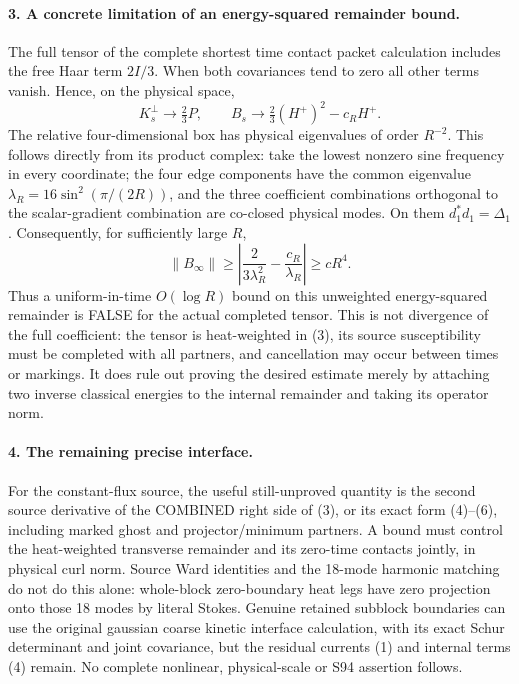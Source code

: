 \documentclass[11pt]{article}
\begin{document}
\paragraph{3. A concrete limitation of an energy-squared remainder bound.}
The full tensor of the complete shortest time contact packet calculation includes the free Haar term $2I/3$. When both
covariances tend to zero all other terms vanish. Hence, on the physical
space,
\[
 K_s^\perp\longrightarrow\tfrac23P,\qquad
 B_s\longrightarrow\tfrac23(H^+)^2-c_RH^+.                    \tag{7}
\]
The relative four-dimensional box has physical eigenvalues of order
$R^{-2}$. This follows directly from its product complex: take the
lowest nonzero sine frequency in every coordinate; the four edge
components have the common eigenvalue
$\lambda_R=16\sin^2(\pi/(2R))$, and the three coefficient combinations
orthogonal to the scalar-gradient combination are co-closed physical
modes. On them $d_1^*d_1=\Delta_1$.
Consequently, for sufficiently large $R$,
\[
 \|B_\infty\|\ge
 \left|\frac{2}{3\lambda_R^2}-\frac{c_R}{\lambda_R}\right|
 \ge cR^4.                                                   \tag{8}
\]
Thus a uniform-in-time $O(\log R)$ bound on this unweighted
energy-squared remainder is FALSE for the actual completed tensor.
This is not divergence of the full coefficient: the tensor is
heat-weighted in (3), its source susceptibility must be completed with
all partners, and cancellation may occur between times or markings.
It does rule out proving the desired estimate merely by attaching two
inverse classical energies to the internal remainder and taking its
operator norm.

\paragraph{4. The remaining precise interface.}
For the constant-flux source, the useful still-unproved quantity is the
second source derivative of the COMBINED right side of (3), or its
exact form (4)--(6), including marked ghost and projector/minimum
partners. A bound must control the heat-weighted transverse remainder
and its zero-time contacts jointly, in physical curl norm. Source Ward
identities and the 18-mode harmonic matching do not do this alone:
whole-block zero-boundary heat legs have zero projection onto those
18 modes by literal Stokes. Genuine retained subblock boundaries can
use the original gaussian coarse kinetic interface calculation, with its exact Schur determinant and joint covariance, but the
residual currents (1) and internal terms (4) remain.
No complete nonlinear, physical-scale or S94 assertion follows.
\end{document}
